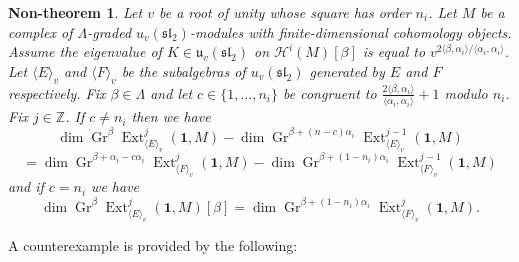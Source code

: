 \documentclass[11pt,letterpaper]{article}
\newtheorem{non-theorem}[theorem]{Non-theorem}
\theoremstyle{definition}
\theoremstyle{remark}
\numberwithin{equation}{section}
\theoremstyle{dotless}
\newcommand{\Gr}{\operatorname{Gr}}
\newcommand{\qv}{v}
\newcommand{\Ext}{\operatorname{Ext}}
\begin{document}
 \begin{non-theorem}\label{key-non-theorem} Let ${\qv}$ be a root of unity whose square has order $n_i$. Let $M$ be a complex of $\Lambda$-graded $u_{\qv}(\mathfrak{sl}_2)$-modules with finite-dimensional cohomology objects. Assume the eigenvalue of $K\in \mathfrak u_{\qv}(\mathfrak{sl}_2)$ on $\mathcal H^{i} (M)[\beta]$ is equal to ${\qv}^{ 2\langle \beta, \alpha_i \rangle / \langle \alpha_i, \alpha_i \rangle }$. Let $\langle E \rangle_{\qv}$ and $\langle F \rangle_{\qv}$ be the subalgebras of $u_{\qv}(\mathfrak{sl}_2)$ generated by $E$ and $F$ respectively. Fix $\beta\in \Lambda$ and let $c \in \{1,\dots, n_i\}$ be congruent to $ \frac{2 \langle \beta, \alpha_i\rangle }{ \langle \alpha_i, \alpha_i\rangle} +1$ modulo $n_i$. Fix $j\in \mathbb Z$. If $c\neq n_i$ then we have  
 \[  \dim \Gr^\beta \Ext^j_{ \langle E\rangle_{\qv}} (\mathbf 1, M )  - \dim \Gr^{\beta + (n-c) \alpha_i} \Ext^{j-1}_{ \langle E\rangle_{\qv}} (\mathbf 1, M )  \] \[ =   \dim \Gr^{\beta+ \alpha_i 
 - c\alpha_i  }\Ext^{j}_{ \langle F\rangle_{\qv}} (\mathbf 1, M )  - \dim \Gr^{\beta  + (1-n_i)  \alpha_i} \Ext^{j-1}_{ \langle F\rangle_{\qv}} (\mathbf 1, M )    \] 
 and if $c=n_i$ we have 
 \[\dim  \Gr^\beta \Ext^j_{ \langle E\rangle_{\qv}} (\mathbf 1, M ) [\beta]= \dim  \Gr^{ \beta+ (1-n_i) \alpha_i} \Ext^j_{ \langle F\rangle_{\qv}} (\mathbf 1, M ) .\]
 \end{non-theorem}

 A counterexample is provided by the following:
\end{document}

